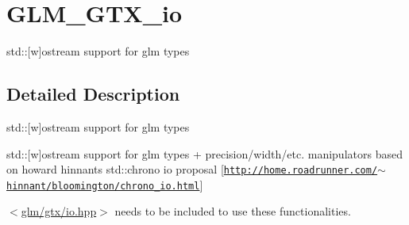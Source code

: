 \hypertarget{group__gtx__io}{}\section{G\+L\+M\+\_\+\+G\+T\+X\+\_\+io}
\label{group__gtx__io}


std\+:\+:\mbox{[}w\mbox{]}ostream support for glm types  




\subsection{Detailed Description}
std\+:\+:\mbox{[}w\mbox{]}ostream support for glm types 

std\+:\+:\mbox{[}w\mbox{]}ostream support for glm types + precision/width/etc. manipulators based on howard hinnant\textquotesingle{}s std\+::chrono io proposal \mbox{[}\href{http://home.roadrunner.com/~hinnant/bloomington/chrono_io.html}{\tt http\+://home.\+roadrunner.\+com/$\sim$hinnant/bloomington/chrono\+\_\+io.\+html}\mbox{]}

$<$\hyperlink{io_8hpp}{glm/gtx/io.\+hpp}$>$ needs to be included to use these functionalities. 